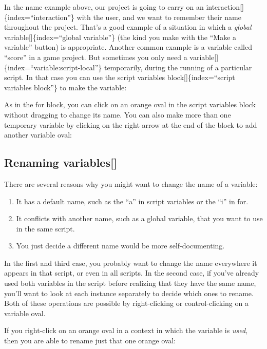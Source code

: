 \documentclass[
  letterpaper,
]{book}
\begin{document}
In the name example above, our project is going to carry on an
interaction{[}{]}\{index=``interaction''\} with the user, and we want to
remember their name throughout the project. That's a good example of a
situation in which a \emph{global} variable{[}{]}\{index=``global
variable''\} (the kind you make with the ``Make a variable'' button) is
appropriate. Another common example is a variable called ``score'' in a
game project. But sometimes you only need a
variable{[}{]}\{index=``variable:script-local''\} temporarily, during
the running of a particular script. In that case you can use the script
variables block{[}{]}\{index=``script variables block''\} to make the
variable:

As in the for block, you can click on an orange oval in the script
variables block without dragging to change its name. You can also make
more than one temporary variable by clicking on the right arrow at the
end of the block to add another variable oval:

\subsection{Renaming variables{[}{]}}\label{renaming-variables}

There are several reasons why you might want to change the name of a
variable:

\begin{enumerate}
\def\labelenumi{\arabic{enumi}.}
\item
  It has a default name, such as the ``a'' in script variables or the
  ``i'' in for.
\item
  It conflicts with another name, such as a global variable, that you
  want to use in the same script.
\item
  You just decide a different name would be more self-documenting.
\end{enumerate}

In the first and third case, you probably want to change the name
everywhere it appears in that script, or even in all scripts. In the
second case, if you've already used both variables in the script before
realizing that they have the same name, you'll want to look at each
instance separately to decide which ones to rename. Both of these
operations are possible by right-clicking or control-clicking on a
variable oval.

If you right-click on an orange oval in a context in which the variable
is \emph{used,} then you are able to rename just that one orange oval:
\end{document}
